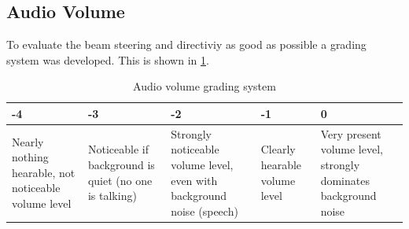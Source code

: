 \subsection{Audio Volume}
To evaluate the beam steering and directiviy as good as possible a grading system was developed. This is shown in \ref{6.1.3_tab:audio_volume}.

\begin{center}
\begin{table}
\centering
\begin{tabular}{ |m{2.2cm}|m{2.2cm}|m{2.2cm}|m{2.2cm}|m{2.2cm}|}
  \hline 
  -4 & -3 & -2 & -1 & 0\\ 
  \hline
Nearly nothing hearable, not noticeable volume level &	Noticeable if background is quiet (no one is talking) &	Strongly noticeable volume level, even with background noise (speech) &	Clearly hearable volume level & Very present volume level, strongly dominates background noise
\\
 \hline
\end{tabular}
\caption{Audio volume grading system}
\label{6.1.3_tab:audio_volume}
\end{table}
\end{center}

